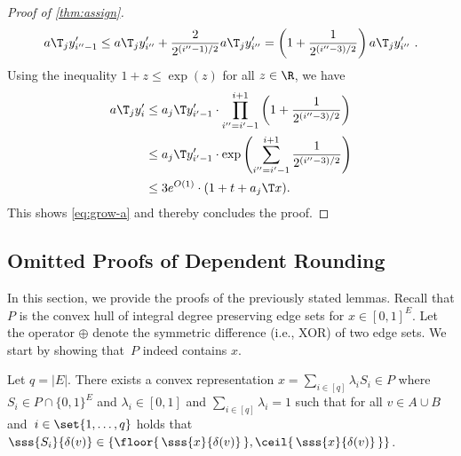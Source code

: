 \begin{proof}[Proof of \cref{thm:assign}]
\begin{equation*}
        a\T_j y'_{i''-1} \le a\T_j y'_{i''} + \frac{2}{2^{(i''-1)/2}} a\T_j y'_{i''} = \left(1 + \frac{1}{2^{(i''-3)/2}}\right) a\T_jy'_{i''} \ .
    \end{equation*}
    Using the inequality $1 + z \le \exp(z)$ for all $z\in\R$, we have
    \begin{align*}
        a\T_j y'_{i} 
        &\le a_j\T y'_{i' - 1} \cdot \prod_{i''=i'-1}^{i+1} \left(1 + \frac{1}{2^{(i''-3)/2}}\right) \\
        &\le a_j\T y'_{i' - 1} \cdot \exp\left(\sum_{i''=i'-1}^{i+1} \frac{1}{2^{(i''-3)/2}}\right) \\
        &\le 3 e^{O(1)} \cdot (1 + t + a_j\T x) .
    \end{align*}
    This shows \cref{eq:grow-a} and thereby concludes the proof.
\end{proof}

\subsection{Omitted Proofs of Dependent Rounding}
\label{subsec:appendix-ommitted-proofs-of-dependent-rounding}

In this section, we provide the proofs of the previously stated lemmas.
Recall that $P$ is the convex hull of integral degree preserving edge sets for $x\in [0,1]^E$.
Let the operator $\oplus$ denote the symmetric difference (i.e., XOR) of two edge sets.
We start by showing that~$P$ indeed contains $x$.

\begin{lemma}
    \label{lem:convex-hull-of-edge-preserving-edge-sets}
    Let $q = |E|$.
    There exists a convex representation $x = \sum_{i \in [q]} \lambda_i S_i \in P$ where $S_i \in P\cap\{0,1\}^E$ and $\lambda_i \in [0,1]$ and
    $\sum_{i \in [q]} \lambda_i = 1$ such that for all $v\in A\cup B$ and~$i \in \set{1,\dotsc,q}$ holds that $\sss{S_i}{\delta(v)} \in \{\floor{\,\sss{x}{\delta(v)}\,}, \ceil{ \,\sss{x}{\delta(v)} \,}\}$.
\end{lemma}

